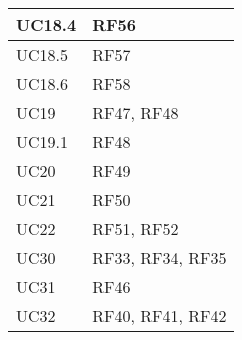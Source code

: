 \begin{center}
\begin{longtable}{|C{5cm}|C{5cm}|}
    UC18.4 & RF56 \\
    \hline
    UC18.5 & RF57 \\
    \hline
    UC18.6 & RF58 \\
    \hline
    UC19 & RF47, RF48 \\
    \hline
    UC19.1 & RF48 \\
    \hline
    UC20 & RF49 \\
    \hline
    UC21 & RF50 \\
    \hline
    UC22 & RF51, RF52 \\
    \hline
    UC30 & RF33, RF34, RF35 \\
    \hline
    UC31 & RF46 \\
    \hline
    UC32 & RF40, RF41, RF42 \\
    \hline
\end{longtable}
\end{center}
